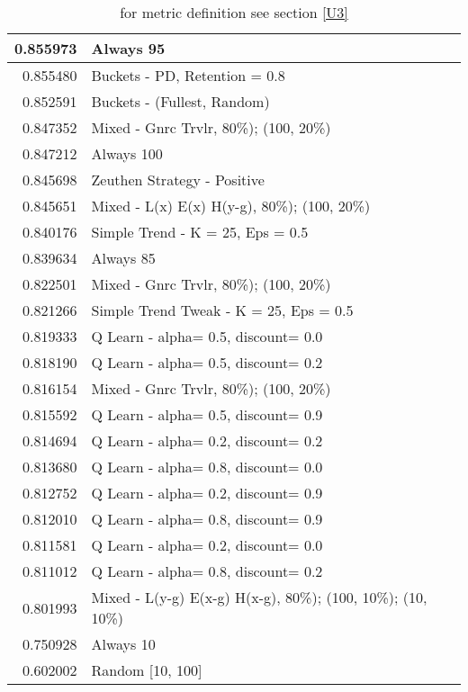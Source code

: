 \begin{table}[!hbtp]
\begin{footnotesize}
\begin{tabular}{|r|l|}
0.855973 & Always 95\\ \hline
0.855480 & Buckets - PD, Retention = 0.8\\ \hline
0.852591 & Buckets - (Fullest, Random)\\ \hline
0.847352 & Mixed - {Gnrc Trvlr, 80\%); (100, 20\%)}\\ \hline
0.847212 & Always 100\\ \hline
0.845698 & Zeuthen Strategy - Positive\\ \hline
0.845651 & Mixed - {L(x) E(x) H(y-g), 80\%); (100, 20\%)}\\ \hline
0.840176 & Simple Trend - K = 25, Eps = 0.5\\ \hline
0.839634 & Always 85\\ \hline
0.822501 & Mixed - {Gnrc Trvlr, 80\%); (100, 20\%)}\\ \hline
0.821266 & Simple Trend Tweak - K = 25, Eps = 0.5\\ \hline
0.819333 & Q Learn - alpha= 0.5, discount= 0.0\\ \hline
0.818190 & Q Learn - alpha= 0.5, discount= 0.2\\ \hline
0.816154 & Mixed - {Gnrc Trvlr, 80\%); (100, 20\%)}\\ \hline
0.815592 & Q Learn - alpha= 0.5, discount= 0.9\\ \hline
0.814694 & Q Learn - alpha= 0.2, discount= 0.2\\ \hline
0.813680 & Q Learn - alpha= 0.8, discount= 0.0\\ \hline
0.812752 & Q Learn - alpha= 0.2, discount= 0.9\\ \hline
0.812010 & Q Learn - alpha= 0.8, discount= 0.9\\ \hline
0.811581 & Q Learn - alpha= 0.2, discount= 0.0\\ \hline
0.811012 & Q Learn - alpha= 0.8, discount= 0.2\\ \hline
0.801993 & Mixed - {L(y-g) E(x-g) H(x-g), 80\%); (100, 10\%); (10, 10\%)}\\ \hline
0.750928 & Always 10\\ \hline
0.602002 & Random [10, 100]\\ \hline
\end{tabular}
\caption{for metric definition see section \eqref{U3}}
\end{footnotesize}
\end{table}

